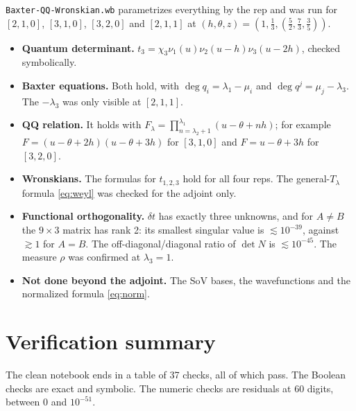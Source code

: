 \documentclass[11pt]{article}
\newcommand{\nb}[1]{\texttt{#1}}
\begin{document}
\nb{Baxter-QQ-Wronskian.wb} parametrizes everything by the rep and was run for $[2,1,0]$, $[3,1,0]$, $[3,2,0]$ and $[2,1,1]$ at $(h,\theta,z)=(1,\tfrac13,(\tfrac52,\tfrac73,\tfrac35))$.

\begin{itemize}
\item \textbf{Quantum determinant.} $t_3=\chi_3\nu_1(u)\nu_2(u-h)\nu_3(u-2h)$, checked symbolically.
\item \textbf{Baxter equations.} Both hold, with $\deg q_i=\lambda_1-\mu_i$ and $\deg q^j=\mu_j-\lambda_3$. The $-\lambda_3$ was only visible at $[2,1,1]$.
\item \textbf{QQ relation.} It holds with $F_\lambda=\prod_{n=\lambda_2+1}^{\lambda_1}(u-\theta+nh)$; for example $F=(u-\theta+2h)(u-\theta+3h)$ for $[3,1,0]$ and $F=u-\theta+3h$ for $[3,2,0]$.
\item \textbf{Wronskians.} The formulas for $t_{1,2,3}$ hold for all four reps. The general-$T_\lambda$ formula \eqref{eq:weyl} was checked for the adjoint only.
\item \textbf{Functional orthogonality.} $\delta t$ has exactly three unknowns, and for $A\ne B$ the $9\times3$ matrix has rank 2: its smallest singular value is $\lesssim10^{-39}$, against $\gtrsim1$ for $A=B$. The off-diagonal/diagonal ratio of $\det N$ is $\lesssim10^{-45}$. The measure $\rho$ was confirmed at $\lambda_3=1$.
\item \textbf{Not done beyond the adjoint.} The SoV bases, the wavefunctions and the normalized formula \eqref{eq:norm}.
\end{itemize}

\section{Verification summary}

The clean notebook ends in a table of 37 checks, all of which pass. The Boolean checks are exact and symbolic. The numeric checks are residuals at 60 digits, between $0$ and $10^{-51}$.
\end{document}
